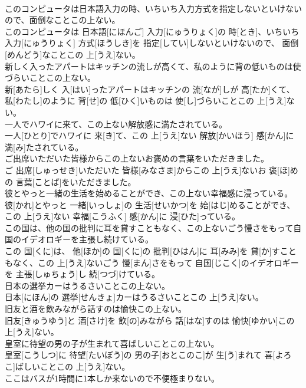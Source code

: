 \documentclass[8pt]{extreport}
\begin{document}
\begin{CJK}{UTF8}{min}
\\	このコンピュータは日本語入力の時、いちいち入力方式を指定しないといけないので、面倒なことこの上ない。	
\\	このコンピュータは 日本語[にほんご] 入力[にゅうりょく]の 時[とき]、いちいち 入力[にゅうりょく] 方式[ほうしき]を 指定[してい]しないといけないので、 面倒[めんどう]なことこの 上[うえ]ない。
\\	新しく入ったアパートはキッチンの流しが高くて、私のように背の低いものは使づらいことこの上ない。	
\\	新[あたら]しく 入[はい]ったアパートはキッチンの 流[なが]しが 高[たか]くて、 私[わたし]のように 背[せ]の 低[ひく]いものは 使[し]づらいことこの 上[うえ]ない。
\\	一人でハワイに来て、この上ない解放感に満たされている。	
\\	一人[ひとり]でハワイに 来[き]て、この 上[うえ]ない 解放[かいほう] 感[かん]に 満[み]たされている。
\\	ご出席いただいた皆様からこの上ないお褒めの言葉をいただきました。	
\\	ご 出席[しゅっせき]いただいた 皆様[みなさま]からこの 上[うえ]ないお 褒[ほ]めの 言葉[ことば]をいただきました。
\\	彼とやっと一緒の生活を始めることができ、この上ない幸福感に浸っている。	
\\	彼[かれ]とやっと 一緒[いっしょ]の 生活[せいかつ]を 始[はじ]めることができ、この 上[うえ]ない 幸福[こうふく] 感[かん]に 浸[ひた]っている。
\\	この国は、他の国の批判に耳を貸すこともなく、この上ないごう慢さをもって自国のイデオロギーを主張し続けている。	
\\	この 国[くに]は、 他[ほか]の 国[くに]の 批判[ひはん]に 耳[みみ]を 貸[か]すこともなく、この 上[うえ]ないごう 慢[まん]さをもって 自国[じこく]のイデオロギーを 主張[しゅちょう]し 続[つづ]けている。
\\	日本の選挙カーはうるさいことこの上ない。	
\\	日本[にほん]の 選挙[せんきょ]カーはうるさいことこの 上[うえ]ない。
\\	旧友と酒を飲みながら話すのは愉快この上ない。	
\\	旧友[きゅうゆう]と 酒[さけ]を 飲[の]みながら 話[はな]すのは 愉快[ゆかい]この 上[うえ]ない。
\\	皇室に待望の男の子が生まれて喜ばしいことこの上ない。	
\\	皇室[こうしつ]に 待望[たいぼう]の 男の子[おとこのこ]が 生[う]まれて 喜[よろこ]ばしいことこの 上[うえ]ない。
\\	ここはバスが1時間に1本しか来ないので不便極まりない。	

\end{CJK}
\end{document}
